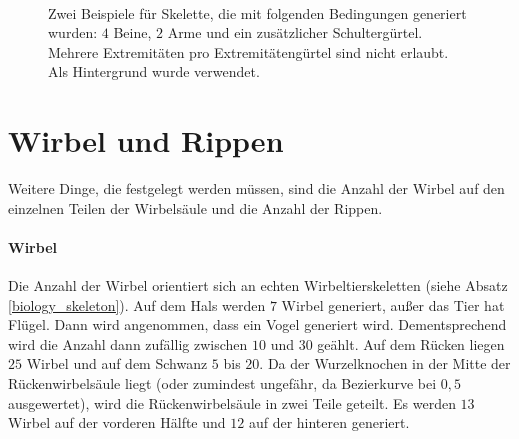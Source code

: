 \begin{figure}
 ~
 
 \caption{Zwei Beispiele für Skelette, die mit folgenden Bedingungen generiert wurden: $4$ Beine, $2$ Arme und ein zusätzlicher Schultergürtel. Mehrere Extremitäten pro Extremitätengürtel sind nicht erlaubt. Als Hintergrund wurde \cite{background} verwendet.}
 \label{zentauren}
\end{figure}


\section{Wirbel und Rippen}
\label{section:vertebrae_ribs}

Weitere Dinge, die festgelegt werden müssen, sind die Anzahl der Wirbel auf den einzelnen Teilen der Wirbelsäule und die Anzahl der Rippen.

\paragraph{Wirbel}
Die Anzahl der Wirbel orientiert sich an echten Wirbeltierskeletten (siehe Absatz \ref{biology_skeleton}). Auf dem Hals werden $7$ Wirbel generiert, außer das Tier hat Flügel. Dann wird angenommen, dass ein Vogel generiert wird. Dementsprechend wird die Anzahl dann zufällig zwischen $10$ und $30$ geählt. Auf dem Rücken liegen $25$ Wirbel und auf dem Schwanz $5$ bis $20$.
Da der Wurzelknochen in der Mitte der Rückenwirbelsäule liegt (oder zumindest ungefähr, da Bezierkurve bei $0{,}5$ ausgewertet), wird die Rückenwirbelsäule in zwei Teile geteilt. Es werden $13$ Wirbel auf der vorderen Hälfte und $12$ auf der hinteren generiert.

